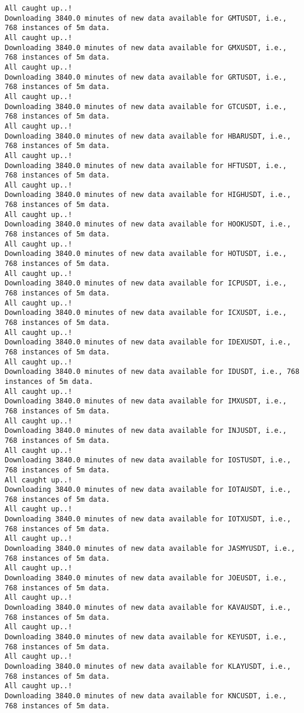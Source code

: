 \documentclass[
  letterpaper,
  DIV=11,
  numbers=noendperiod]{scrartcl}
\begin{document}
\begin{verbatim}
All caught up..!
Downloading 3840.0 minutes of new data available for GMTUSDT, i.e., 768 instances of 5m data.
All caught up..!
Downloading 3840.0 minutes of new data available for GMXUSDT, i.e., 768 instances of 5m data.
All caught up..!
Downloading 3840.0 minutes of new data available for GRTUSDT, i.e., 768 instances of 5m data.
All caught up..!
Downloading 3840.0 minutes of new data available for GTCUSDT, i.e., 768 instances of 5m data.
All caught up..!
Downloading 3840.0 minutes of new data available for HBARUSDT, i.e., 768 instances of 5m data.
All caught up..!
Downloading 3840.0 minutes of new data available for HFTUSDT, i.e., 768 instances of 5m data.
All caught up..!
Downloading 3840.0 minutes of new data available for HIGHUSDT, i.e., 768 instances of 5m data.
All caught up..!
Downloading 3840.0 minutes of new data available for HOOKUSDT, i.e., 768 instances of 5m data.
All caught up..!
Downloading 3840.0 minutes of new data available for HOTUSDT, i.e., 768 instances of 5m data.
All caught up..!
Downloading 3840.0 minutes of new data available for ICPUSDT, i.e., 768 instances of 5m data.
All caught up..!
Downloading 3840.0 minutes of new data available for ICXUSDT, i.e., 768 instances of 5m data.
All caught up..!
Downloading 3840.0 minutes of new data available for IDEXUSDT, i.e., 768 instances of 5m data.
All caught up..!
Downloading 3840.0 minutes of new data available for IDUSDT, i.e., 768 instances of 5m data.
All caught up..!
Downloading 3840.0 minutes of new data available for IMXUSDT, i.e., 768 instances of 5m data.
All caught up..!
Downloading 3840.0 minutes of new data available for INJUSDT, i.e., 768 instances of 5m data.
All caught up..!
Downloading 3840.0 minutes of new data available for IOSTUSDT, i.e., 768 instances of 5m data.
All caught up..!
Downloading 3840.0 minutes of new data available for IOTAUSDT, i.e., 768 instances of 5m data.
All caught up..!
Downloading 3840.0 minutes of new data available for IOTXUSDT, i.e., 768 instances of 5m data.
All caught up..!
Downloading 3840.0 minutes of new data available for JASMYUSDT, i.e., 768 instances of 5m data.
All caught up..!
Downloading 3840.0 minutes of new data available for JOEUSDT, i.e., 768 instances of 5m data.
All caught up..!
Downloading 3840.0 minutes of new data available for KAVAUSDT, i.e., 768 instances of 5m data.
All caught up..!
Downloading 3840.0 minutes of new data available for KEYUSDT, i.e., 768 instances of 5m data.
All caught up..!
Downloading 3840.0 minutes of new data available for KLAYUSDT, i.e., 768 instances of 5m data.
All caught up..!
Downloading 3840.0 minutes of new data available for KNCUSDT, i.e., 768 instances of 5m data.

\end{verbatim}
\end{document}
